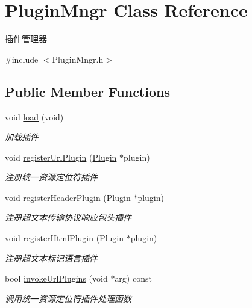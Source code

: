 \hypertarget{class_plugin_mngr}{}\section{Plugin\+Mngr Class Reference}
\label{class_plugin_mngr}


插件管理器  




{\ttfamily \#include $<$Plugin\+Mngr.\+h$>$}

\subsection*{Public Member Functions}
\begin{DoxyCompactItemize}
\item 
\mbox{\label{class_plugin_mngr_a8fb487bb33fc83355d285231a86e4bf2}} 
void \hyperlink{class_plugin_mngr_a8fb487bb33fc83355d285231a86e4bf2}{load} (void)
\begin{DoxyCompactList}\small\item\em 加载插件 \end{DoxyCompactList}\item 
void \hyperlink{class_plugin_mngr_a016ae68984aa3c04a32eaf29a334b5d5}{register\+Url\+Plugin} (\hyperlink{class_plugin}{Plugin} $\ast$plugin)
\begin{DoxyCompactList}\small\item\em 注册统一资源定位符插件 \end{DoxyCompactList}\item 
void \hyperlink{class_plugin_mngr_a4b1e91927684b2f976ca97fb441baeb7}{register\+Header\+Plugin} (\hyperlink{class_plugin}{Plugin} $\ast$plugin)
\begin{DoxyCompactList}\small\item\em 注册超文本传输协议响应包头插件 \end{DoxyCompactList}\item 
void \hyperlink{class_plugin_mngr_a27dbc387de2030fbdf6df8e61922a340}{register\+Html\+Plugin} (\hyperlink{class_plugin}{Plugin} $\ast$plugin)
\begin{DoxyCompactList}\small\item\em 注册超文本标记语言插件 \end{DoxyCompactList}\item 
bool \hyperlink{class_plugin_mngr_a28131538a70ca1ec9458d843efb0351c}{invoke\+Url\+Plugins} (void $\ast$arg) const
\begin{DoxyCompactList}\small\item\em 调用统一资源定位符插件处理函数 \end{DoxyCompactList}\item 

\end{DoxyCompactItemize}
